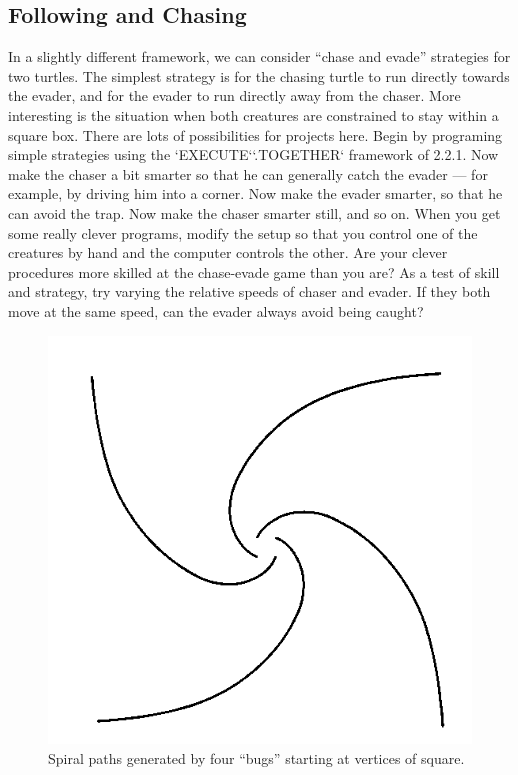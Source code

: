 \documentclass{book}
\begin{document}
\subsection{Following and Chasing}

In a slightly different framework, we can consider ``chase and evade''
strategies for two turtles. The simplest strategy is for the chasing turtle
to run directly towards the evader, and for the evader to run directly
away from the chaser. More interesting is the situation when both
creatures are constrained to stay within a square box. There are lots
of possibilities for projects here. Begin by programing simple strategies
using the \textsc{`EXECUTE`}\textsc{`.TOGETHER`} framework of 2.2.1. Now make the chaser
a bit smarter so that he can generally catch the evader --- for example, by
driving him into a corner. Now make the evader smarter, so that he can
avoid the trap. Now make the chaser smarter still, and so on. When you
get some really clever programs, modify the setup so that you control
one of the creatures by hand and the computer controls the other. Are
your clever procedures more skilled at the chase-evade game than you
are? As a test of skill and strategy, try varying the relative speeds of
chaser and evader. If they both move at the same speed, can the evader
always avoid being caught?

\begin{figure}
\begin{center}
\includegraphics[scale=1]{fig2-12}
\caption{Spiral paths generated by four ``bugs'' starting at vertices of square.}
\end{center}
\end{figure}
\end{document}
